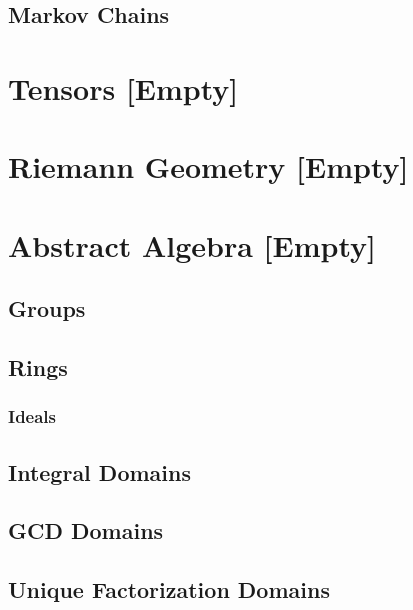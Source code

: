 \documentclass[12pt, english]{book}
\begin{document}
	\chapter{Markov Chains} \label{Markov Chains Chapter - Linear Algebra}
	
	
	\part{Tensors [Empty]} \label{Tensors Part}
	
	
	\part{Riemann Geometry [Empty]} \label{Reimann Geometry Part}
	
	
	\part{Abstract Algebra [Empty]} \label{Abstract Algebra Part}
	
	\chapter{Groups} \label{Groups Chapter - Abstract Algebra}
	
	
	\chapter{Rings} \label{Rings Chapter - Abstract Algebra}
	
	\section{Ideals} \label{Ideals Section - Abstract Algebra}
	
	\chapter{Integral Domains} \label{Integral Domains Chapter - Abstract Algebra}
	
	\chapter{GCD Domains} \label{GCD Domains Chapter - Abstract Algebra}
	
	\chapter{Unique Factorization Domains} \label{Unique Factorization Domains Chapter - Abstract Algebra}
	
\end{document}
